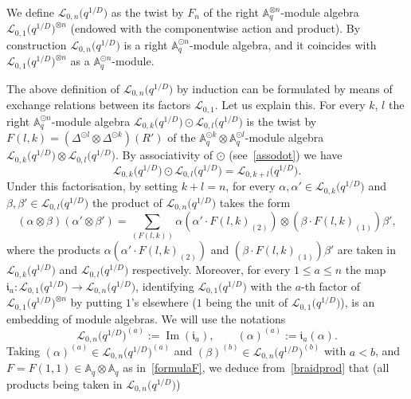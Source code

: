 \documentclass[pdftex]{sigma}%
\numberwithin{equation}{section}
\numberwithin{figure}{section}
\newcommand{\Ll}{{\mathcal L}}
\newcommand{\ra}{\rightarrow}
\begin{document}
 We define $\Ll_{0,n}\big(q^{1/D}\big)$ as the twist by $F_n$ of the right $\mathbb{A}_q^{\otimes n}$-module algebra $\Ll_{0,1}\big(q^{1/D}\big)^{\otimes n}$ (endowed with the componentwise action and product). By construction $\Ll_{0,n}\big(q^{1/D}\big)$ is a right $\mathbb{A}_q^{\odot n}$-module algebra, and it coincides with $\Ll_{0,1}\big(q^{1/D}\big)^{\otimes n}$ as a $\mathbb{A}_q^{\odot n}$-module.

The above definition of $\Ll_{0,n}\big(q^{1/D}\big)$ by induction can be formulated by means of exchange relations between its factors $\Ll_{0,1}$. Let us explain this. For every $k$, $l$ the right $\mathbb{A}_q^{\odot n}$-module algebra $\Ll_{0,k}\big(q^{1/D}\big) \odot \Ll_{0,l}\big(q^{1/D}\big)$ is the twist by $\textstyle F(l,k) = ({\Delta}^{\odot l} \otimes {\Delta}^{\odot k})(R')$ of the $\mathbb{A}_q^{\odot k} {\otimes} \mathbb{A}_q^{\odot l}$-module algebra $\Ll_{0,k}\big(q^{1/D}\big) \otimes \Ll_{0,l}\big(q^{1/D}\big)$. By associativity of ${\odot}$ (see~\eqref{assodot}) we have
 \begin{equation*}%
 \Ll_{0,k}\big(q^{1/D}\big) \odot \Ll_{0,l}\big(q^{1/D}\big) = \Ll_{0,k+l}\big(q^{1/D}\big).
 \end{equation*}
 Under this factorisation, by setting $k+l=n$, for every $\alpha, \alpha' \in \Ll_{0,k}\big(q^{1/D}\big)$ and $\beta,\beta'\in \Ll_{0,l}\big(q^{1/D}\big)$ the product of $\Ll_{0,n}\big(q^{1/D}\big)$ takes the form
 \begin{equation}\label{braidprod}
 (\alpha \otimes \beta)(\alpha'\otimes \beta') = \sum_{(F(l,k))} \alpha (\alpha'\cdot F(l,k)_{(2)}) \otimes (\beta\cdot F(l,k)_{(1)})\beta',
 \end{equation}
where
 the products $\alpha (\alpha'\cdot F(l,k)_{(2)})$ and $(\beta\cdot F(l,k)_{(1)})\beta'$ are taken in $\Ll_{0,k}\big(q^{1/D}\big)$ and $\Ll_{0,l}\big(q^{1/D}\big)$ respectively. Moreover, for every $1\leq a\leq n$ the map $\mathfrak{i}_a\colon \Ll_{0,1}\big(q^{1/D}\big)\ra \Ll_{0,n}\big(q^{1/D}\big)$, identifying $\Ll_{0,1}\big(q^{1/D}\big)$ with the $a$-th factor of $\Ll_{0,1}\big(q^{1/D}\big)^{\otimes n}$ by putting $1$'s elsewhere \big($1$ being the unit of $\Ll_{0,1}\big(q^{1/D}\big)$\big), is an embedding of module algebras. We will use the notations
\[\Ll_{0,n}\big(q^{1/D}\big)^{(a)}:= \operatorname{Im}(\mathfrak{i}_a) ,\qquad (\alpha)^{(a)} := \mathfrak{i}_a(\alpha).\]
Taking $(\alpha)^{(a)} \in \Ll_{0,n}\big(q^{1/D}\big)^{(a)}$ and $(\beta)^{(b)} \in \Ll_{0,n}\big(q^{1/D}\big)^{(b)}$ with $a<b$, and $F=F(1,1)\in \mathbb{A}_q{\otimes}\mathbb{A}_q$ as in~\eqref{formulaF}, we deduce from~\eqref{braidprod} that \big(all products being taken in $\Ll_{0,n}\big(q^{1/D}\big)$\big)
\end{document}
